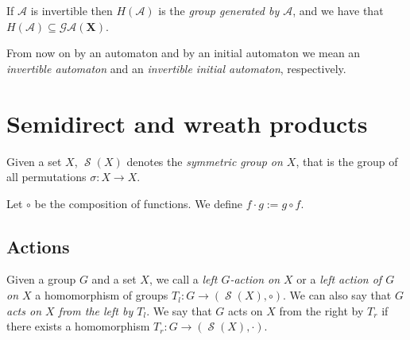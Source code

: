 \documentclass[mat1]{fmfdeloTS2.0}
\newcommand{\abece}{\mathbf{X}}			%
\newcommand{\fslovar}{\mathbf{X^*}}		%
\newcommand{\auto}{\mathcal}			%
\newcommand{\synaut}{\mathcal{GA}}	%
\DeclareMathOperator{\aut}{\mathrm{Aut}}		%
\DeclareMathOperator{\symm}{\mathcal{S}}		%
\begin{document}
\begin{remark}
If $\auto{A}$ is invertible then $H(\auto{A})$ is the \emph{group generated by $\auto{A}$}, and we have that $H(\auto{A}) \subseteq \synaut(\abece)$.
\end{remark}

\begin{remark}
From now on by an automaton and by an initial automaton we mean an \emph{invertible automaton} and an \emph{invertible initial automaton}, respectively.
\end{remark}

\smallskip
\section{Semidirect and wreath products}

%
%    
Given a set $X$, $\symm(X)$ denotes the \emph{symmetric group on $X$}, that is the group of all permutations $\sigma:X\longrightarrow X$.

\begin{definition}
Let $\circ$ be the composition of functions. We define $f\cdot g:=g\circ f$.
\end{definition}

\subsection{Actions}

\begin{definition}
Given a group $G$ and a set $X$, we call a \emph{left $G$-action on $X$} or a \emph{left action of $G$ on $X$} a homomorphism of groups $T_l:G\longrightarrow(\symm(X),\circ)$. We can also say that \emph{$G$ acts on $X$ from the left by $T_l$}.
We say that $G$ acts on $X$ from the right by $T_r$ if there exists a homomorphism $T_r: G\longrightarrow(\symm(X),\cdot)$.
\label{def:actions}
\end{definition}
\end{document}
